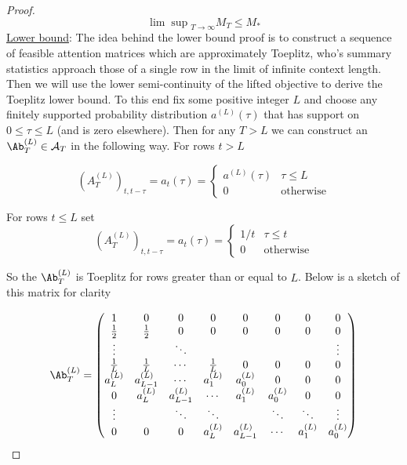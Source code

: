 \documentclass{article}
\begin{document}
\begin{proof}
\begin{equation}\label{upperbound}
    {\lim \sup}_{T \to \infty} M_T \le M_\ast
\end{equation}
\newline
\newline
\underline{Lower bound}:
\newline
\newline
The idea behind the lower bound proof is to construct a sequence of feasible attention matrices which are approximately Toeplitz, who's summary statistics approach those of a single row in the limit of infinite context length. Then we will use the lower semi-continuity of the lifted objective to derive the Toeplitz lower bound. To this end fix some positive integer $L$ and choose any finitely supported probability distribution $a^{(L)}(\tau)$ that has support on $0 \le \tau\le L$ (and is zero elsewhere). Then for any $T > L$ we can construct an $\Ab^{(L)}_T \in \mathcal{A}_T$ in the following way. For rows $t > L$

\begin{equation}
    (A^{(L)}_T)_{t, t-\tau} = a_t(\tau) = 
    \begin{cases}
        a^{(L)}(\tau) & \tau \le L \\
        0 & \textrm{otherwise}
       
    \end{cases}
\end{equation}

For rows $t\le L$ set 
\begin{equation}
    (A^{(L)}_T)_{t, t-\tau} = a_t(\tau) = 
    \begin{cases}
        1/t & \tau \le t \\
        0 & \textrm{otherwise}
    \end{cases}
\end{equation}

So the $\Ab^{(L)}_T$ is Toeplitz for rows greater than or equal to $L$. Below is a sketch of this matrix for clarity

\begin{equation}\label{aL}
\Ab^{(L)}_{T}=
\begin{pmatrix}
1 & 0 & 0 & 0 & 0 & 0 & 0 & 0\\
\tfrac{1}{2} & \tfrac{1}{2} & 0 & 0 & 0 & 0 & 0 & 0\\
\vdots & & \ddots & & & & & \vdots\\
\tfrac{1}{L} & \tfrac{1}{L} & \cdots & \tfrac{1}{L} & 0 & 0 & 0 & 0\\
a^{(L)}_{L} & a^{(L)}_{L-1} & \cdots & a^{(L)}_{1} & a^{(L)}_{0} & 0 & 0 & 0\\
0 & a^{(L)}_{L} & a^{(L)}_{L-1} & \cdots & a^{(L)}_{1} & a^{(L)}_{0} & 0 & 0\\
\vdots & & \ddots & \ddots & & \ddots & \ddots & \vdots\\
0 & 0 & 0 & a^{(L)}_{L} & a^{(L)}_{L-1} & \cdots & a^{(L)}_{1} & a^{(L)}_{0}\\
\end{pmatrix}
\end{equation}


\end{proof}
\end{document}
